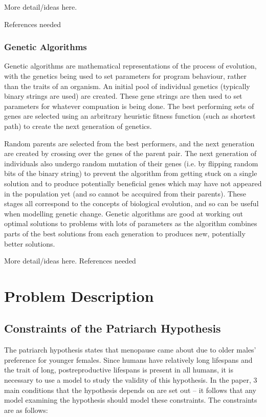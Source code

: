 \documentclass[authoryearcitations]{UoYCSproject}
\begin{document}
\begin{framed}
More detail/ideas here. 

References needed
\end{framed}


\subsection{Genetic Algorithms}
Genetic algorithms are mathematical representations of the process of evolution, with the genetics being used to set parameters for program behaviour, rather than the traits of an organism. An initial pool of individual genetics (typically binary strings are used) are created. These gene strings are then used to set parameters for whatever compuation is being done. The best performing sets of genes are selected using an arbritrary heuristic fitness function (such as shortest path) to create the next generation of genetics. 

Random parents are selected from the best performers, and the next generation are created by crossing over the genes of the parent pair. The next generation of individuals also undergo random mutation of their genes (i.e. by flipping random bits of the binary string) to prevent the algorithm from getting stuck on a single solution and to produce potentially beneficial genes which may have not appeared in the population yet (and so cannot be accquired from their parents). These stages all correspond to the concepts of biological evolution, and so can be useful when modelling genetic change. Genetic algorithms are good at working out optimal solutions to problems with lots of parameters as the algorithm combines parts of the best solutions from each generation to produces new, potentially better solutions. 

\begin{framed}
More detail/ideas here. References needed
\end{framed}


\chapter{Problem Description}
\label{cha:Problem Description}

\section{Constraints of the Patriarch Hypothesis}
The patriarch hypothesis \cite{patriarchHypothesis2000} states that menopause came about due to older males' preference for younger females. Since humans have relatively long lifespans and the trait of long, postreproductive lifespans is present in all humans, it is necessary to use a model to study the validity of this hypothesis. In the paper, 3 main conditions that the hypothesis depends on are set out -- it follows that any model examining the hypothesis should model these constraints. The constraints are as follows:
\end{document}
